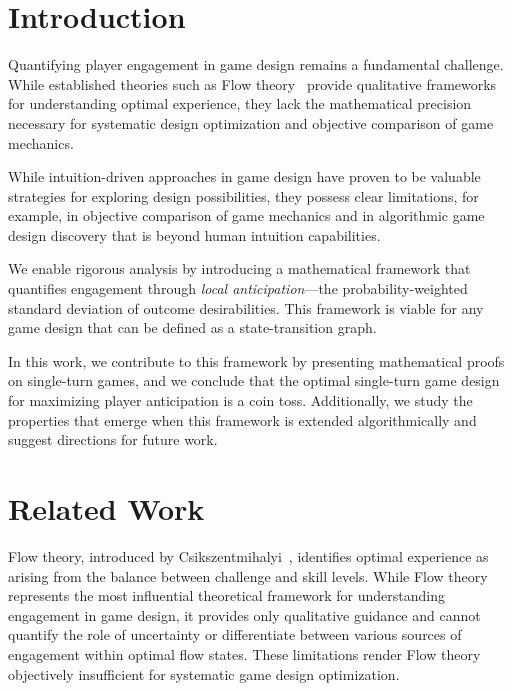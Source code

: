 \documentclass[manuscript,review,anonymous]{acmart}
\theoremstyle{definition}
\theoremstyle{plain}
\begin{document}

\maketitle

\section{Introduction}
Quantifying player engagement in game design remains a fundamental challenge.
While established theories such as Flow theory~\cite{csikszentmihalyi1990flow} provide qualitative frameworks for understanding optimal experience, they lack the mathematical precision necessary for systematic design optimization and objective comparison of game mechanics.

While intuition-driven approaches in game design have proven to be valuable strategies for exploring design possibilities, they possess clear limitations, for example, in objective comparison of game mechanics and in algorithmic game design discovery that is beyond human intuition capabilities.

We enable rigorous analysis by introducing a mathematical framework that quantifies engagement through \emph{local anticipation}---the probability-weighted standard deviation of outcome desirabilities.
This framework is viable for any game design that can be defined as a state-transition graph.

In this work, we contribute to this framework by presenting mathematical proofs on single-turn games, and we conclude that the optimal single-turn game design for maximizing player anticipation is a coin toss.
Additionally, we study the properties that emerge when this framework is extended algorithmically and suggest directions for future work.

\section{Related Work}
Flow theory, introduced by Csikszentmihalyi~\cite{csikszentmihalyi1990flow}, identifies optimal experience as arising from the balance between challenge and skill levels.
While Flow theory represents the most influential theoretical framework for understanding engagement in game design, it provides only qualitative guidance and cannot quantify the role of uncertainty or differentiate between various sources of engagement within optimal flow states.
These limitations render Flow theory objectively insufficient for systematic game design optimization.
\end{document}
